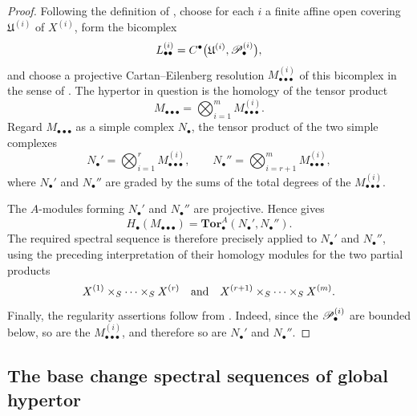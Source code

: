 \begin{proof}
Following the definition of , choose for each $i$
a finite affine open covering $\mathfrak U^{(i)}$ of $X^{(i)}$,
form the bicomplex
\[
  L_{\bullet\bullet}^{(i)}
  =
  C^\bullet
  \bigl(
    \mathfrak U^{(i)},\mathscr{P}_\bullet^{(i)}
  \bigr),
\]
and choose a projective Cartan--Eilenberg resolution
$M_{\bullet\bullet\bullet}^{(i)}$ of this bicomplex in the sense
of .  The hypertor in question is the homology
of the tensor product
\[
  M_{\bullet\bullet\bullet}
  =
  \bigotimes_{i=1}^{m}
  M_{\bullet\bullet\bullet}^{(i)}.
\]
Regard $M_{\bullet\bullet\bullet}$ as a simple complex
$N_\bullet$, the tensor product of the two simple complexes
\[
  N_\bullet'
  =
  \bigotimes_{i=1}^{r}
  M_{\bullet\bullet\bullet}^{(i)},
  \qquad
  N_\bullet''
  =
  \bigotimes_{i=r+1}^{m}
  M_{\bullet\bullet\bullet}^{(i)},
\]
where $N_\bullet'$ and $N_\bullet''$ are graded by the sums of the
total degrees of the $M_{\bullet\bullet\bullet}^{(i)}$.

The $A$-modules forming $N_\bullet'$ and $N_\bullet''$ are
projective.  Hence  gives
\[
  H_\bullet(M_{\bullet\bullet\bullet})
  =
  \mathbf{Tor}_\bullet^A(N_\bullet',N_\bullet'').
\]
The required spectral sequence is therefore precisely
 applied to $N_\bullet'$ and $N_\bullet''$,
using the preceding interpretation of their homology modules for
the two partial products
\[
  X^{(1)}\times_S\cdots\times_SX^{(r)}
  \quad\hbox{and}\quad
  X^{(r+1)}\times_S\cdots\times_SX^{(m)}.
\]
Finally, the regularity assertions follow from
.  Indeed, since the
$\mathscr{P}_\bullet^{(i)}$ are bounded below, so are the
$M_{\bullet\bullet\bullet}^{(i)}$, and therefore so are
$N_\bullet'$ and $N_\bullet''$.
\end{proof}

\subsection{The base change spectral sequences of global hypertor}
\label{subsection:III.6.9}
\label{III.6.9}

